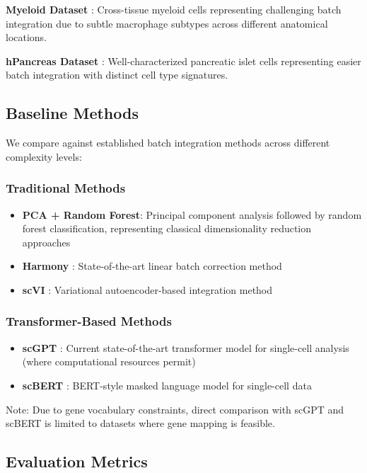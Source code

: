 \textbf{Myeloid Dataset} \citep{myeloid2023}: Cross-tissue myeloid cells representing challenging batch integration due to subtle macrophage subtypes across different anatomical locations.

\textbf{hPancreas Dataset} \citep{hpancreas2023}: Well-characterized pancreatic islet cells representing easier batch integration with distinct cell type signatures.

\subsection{Baseline Methods}

We compare \bioformer{} against established batch integration methods across different complexity levels:

\subsubsection{Traditional Methods}
\begin{itemize}
\item \textbf{PCA + Random Forest}: Principal component analysis followed by random forest classification, representing classical dimensionality reduction approaches
\item \textbf{Harmony} \citep{korsunsky2019fast}: State-of-the-art linear batch correction method
\item \textbf{scVI} \citep{lopez2018deep}: Variational autoencoder-based integration method
\end{itemize}

\subsubsection{Transformer-Based Methods}
\begin{itemize}
\item \textbf{scGPT} \citep{cui2024scgpt}: Current state-of-the-art transformer model for single-cell analysis (where computational resources permit)
\item \textbf{scBERT} \citep{yang2022scbert}: BERT-style masked language model for single-cell data
\end{itemize}

Note: Due to gene vocabulary constraints, direct comparison with scGPT and scBERT is limited to datasets where gene mapping is feasible.

\subsection{Evaluation Metrics}

